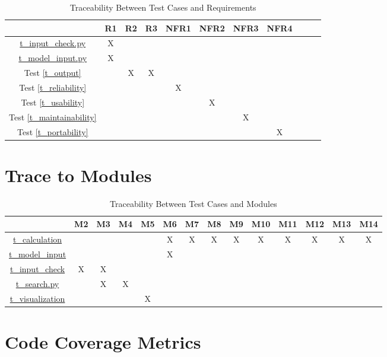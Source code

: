 \documentclass[12pt, titlepage]{article}
\begin{document}
\begin{table}[h]
\centering
\begin{tabular}{|c|c|c|c|c|c|c|c|c|c|c|}
\hline
	& R1 & R2 & R3  & NFR1 & NFR2 & NFR3 & NFR4  \\
\hline
\href{https://github.com/CynthiaLiu0805/BridgeCorrosion/blob/main/src/app/test_input_check.py}{t\_input\_check.py}        & X & & & & & &  \\ \hline
\href{https://github.com/CynthiaLiu0805/BridgeCorrosion/blob/main/src/database/test_model_check.py}{t\_model\_input.py} & X & & & & & &  \\ \hline
Test \ref{t_output}        & & X & X & & & &  \\ \hline
Test \ref{t_reliability}        & & & & X & & &  \\ \hline
Test \ref{t_usability}        & & & & & X & &  \\ \hline
Test \ref{t_maintainability}        & & & & & & X &  \\ \hline
Test \ref{t_portability}        & & & & & & & X  \\ \hline

\end{tabular}
\caption{Traceability Between Test Cases and Requirements}
\label{Table:test_requirements}
\end{table}


\section{Trace to Modules}		
\begin{table}[h]
\centering
\begin{tabular}{|c|c|c|c|c|c|c|c|c|c|c|c|c|c|}
\hline
	& M2 & M3 & M4  & M5 & M6 & M7 & M8 & M9 & M10 & M11 & M12 & M13 & M14 \\
\hline

\href{https://github.com/CynthiaLiu0805/BridgeCorrosion/blob/main/src/database/test_calculation.py}{t\_calculation}    & &  &  &  & X & X & X & X & X & X & X & X & X \\ \hline
\href{https://github.com/CynthiaLiu0805/BridgeCorrosion/blob/main/src/database/test_model_check.py}{t\_model\_input} & &  &  &  & X &  & &  &  &  &  &  & \\ \hline
\href{https://github.com/CynthiaLiu0805/BridgeCorrosion/blob/main/src/app/test_input_check.py}{t\_input\_check} & X & X &  &  &  &  & &  &  &  &  &  & \\ \hline
\href{https://github.com/CynthiaLiu0805/BridgeCorrosion/blob/main/src/app/test_search.py}{t\_search.py} & & X & X &  &  &  & &  &  &  &  &  & \\ \hline
\href{https://github.com/CynthiaLiu0805/BridgeCorrosion/blob/main/src/app/test_visualization.py}{t\_visualization} & &  &  & X &  &  & &  &  &  &  &  & \\ \hline

\end{tabular}
\caption{Traceability Between Test Cases and Modules}
\label{Table:test_modules}
\end{table}
\section{Code Coverage Metrics}




\newpage{}
\end{document}
